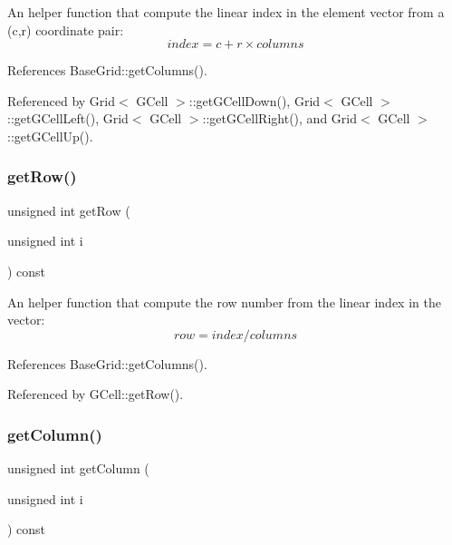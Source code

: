 An helper function that compute the linear index in the element vector from a {\ttfamily }(c,r) coordinate pair\+: \[ index = c + r \times columns \] 

References Base\+Grid\+::get\+Columns().



Referenced by Grid$<$ G\+Cell $>$\+::get\+G\+Cell\+Down(), Grid$<$ G\+Cell $>$\+::get\+G\+Cell\+Left(), Grid$<$ G\+Cell $>$\+::get\+G\+Cell\+Right(), and Grid$<$ G\+Cell $>$\+::get\+G\+Cell\+Up().

\mbox{\label{classKatabatic_1_1BaseGrid_a8108a276ab72226244d302fb1b59f3f1}} 
\subsubsection{\texorpdfstring{get\+Row()}{getRow()}}
{\footnotesize\ttfamily unsigned int get\+Row (\begin{DoxyParamCaption}\item[{unsigned int}]{i }\end{DoxyParamCaption}) const\hspace{0.3cm}{\ttfamily [inline]}}

An helper function that compute the row number from the linear index in the vector\+: \[ row = index / columns \] 

References Base\+Grid\+::get\+Columns().



Referenced by G\+Cell\+::get\+Row().

\mbox{\label{classKatabatic_1_1BaseGrid_a21a8582c0c89a61d1963262fa053bc1b}} 
\subsubsection{\texorpdfstring{get\+Column()}{getColumn()}}
{\footnotesize\ttfamily unsigned int get\+Column (\begin{DoxyParamCaption}\item[{unsigned int}]{i }\end{DoxyParamCaption}) const\hspace{0.3cm}{\ttfamily [inline]}}

